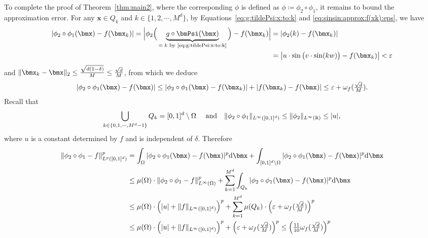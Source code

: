 \documentclass[11pt,a4paper]{article}
\begin{document}
To complete the proof of Theorem~\ref{thm:main2}, where the corresponding $\phi$ is defined as $\phi \coloneqq \phi_2 \circ \phi_1$, it remains to bound the approximation error.
For any \(\bm{x} \in Q_k\) and \(k \in \{1, 2, \cdots, M^d\}\), by Equations~\eqref{eq:g:tildePsi:x:to:k} and \eqref{eq:sinsin:approx:f(xk):eps}, we have
\begin{equation*}
    \begin{split}
        |\phi_2\circ \phi_1(\bmx)-f(\bmx_k)|  
        =\Big|\phi_2\Big(
        \underbrace{g\circ\bmPsi(\bmx)}_{\tn{$=k$ by \eqref{eq:g:tildePsi:x:to:k}}}
        \Big)-f(\bmx_k)\Big|        
        &= |\phi_2 ( k )-f(\bmx_k) |
        \\ &
         =\left| u \cdot \sin\big(v \cdot \sin(k w)\big) - f(\bmx_k) \right| < \epsilon
    \end{split}
\end{equation*}
and $\|\bmx_k-\bmx\|_2\le \tfrac{\sqrt{d(1-\delta)}}{M}\le \frac{\sqrt{d}}{M}$,
from which we deduce
\begin{equation*}
    \begin{split}
        |\phi_2\circ \phi_1(\bmx)-f(\bmx)|
         \le 
        |\phi_2\circ \phi_1(\bmx)-f(\bmx_k)|
        +|f(\bmx_k)-f(\bmx)|
        \le \eps + \omega_f(\tfrac{\sqrt{d}}{M}).
    \end{split}
\end{equation*}
Recall that 
\begin{equation*}
    \bigcup_{k\in \{0,1,\mathinner{\mkern-0.1mu\cdotp\mkern-0.3mu\cdotp\mkern-0.3mu\cdotp\mkern-0.1mu},M^d-1\}} Q_{k} = [0,1]^d \setminus \Omega\quad \textnormal{ and}  \quad
  \|\phi_2 \circ \phi_1\|_{L^\infty([0,1]^d)} \le \|\phi_2\|_{L^\infty(\mathbb{R})}  \le |u|,
\end{equation*}
where \(u\) is a constant determined by \(f\) and is independent of \(\delta\).
Therefore
	\begin{equation*}
	\begin{split}
	\| \phi_2\circ \phi_1-f\|_{L^p([0,1]^d)}^p
	&=\int_{\Omega}| \phi_2\circ \phi_1(\bmx)-f(\bmx)|^p\tn{d}\bmx
    +
    \int_{[0,1]^d\backslash\Omega}|\phi_2\circ \phi_1(\bmx)-f(\bmx)|^p\tn{d}\bmx
 \\
 	&\le 
 \mu(\Omega)\cdot \| \phi_2\circ \phi_1-f\|_{L^\infty(\Omega)}^p
 + \sum_{k=1}^{M^d}\int_{Q_k}| \phi_2\circ \phi_1(\bmx)-f(\bmx)|^p\tn{d}\bmx
	\\&\le 
 \mu(\Omega)\cdot \Big(|u|+\|f\|_{L^\infty([0,1]^d)}\Big)^p
 + \sum_{k=1}^{M^d}
 \mu(Q_k)\cdot\Big(\eps + \omega_f(\tfrac{\sqrt{d}}{M})\Big)^p
 \\&\le 
 \mu(\Omega)\cdot \Big(|u|+\|f\|_{L^\infty([0,1]^d)}\Big)^p
 + \Big(\eps + \omega_f(\tfrac{\sqrt{d}}{M})\Big)^p
 \le \Big(\tfrac{11}{10}\omega_f(\tfrac{\sqrt{d}}{M})\Big)^p
	\end{split}
	\end{equation*}
\end{document}
